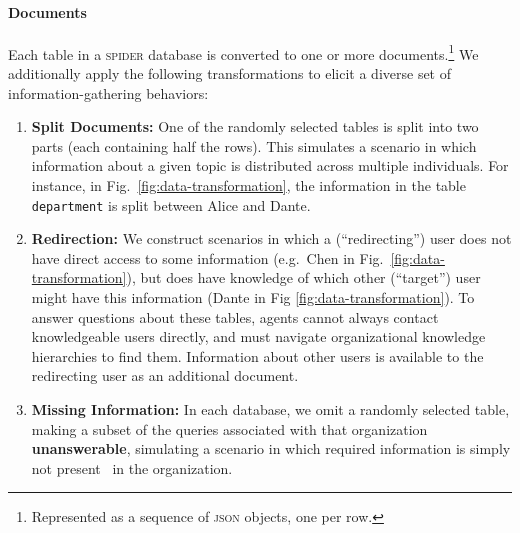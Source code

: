 \paragraph{Documents}
Each table in a \textsc{spider} database is converted to one or more documents.\footnote{Represented as a sequence of \textsc{json} objects, one per row.} We additionally apply the following transformations to elicit a diverse set of information-gathering behaviors:%

\begin{enumerate}
     \item \textbf{Split Documents:}  One of the randomly selected tables is split into two parts (each containing half the rows). This simulates a scenario in which information about a given topic is distributed across multiple individuals. 
     For instance, in Fig.~\ref{fig:data-transformation}, the information in the table \texttt{department} is split between Alice and Dante. 
    \item \textbf{Redirection:} We construct scenarios in which a (``redirecting'') user does not have direct access to some information (e.g.\ Chen in Fig.~\ref{fig:data-transformation}), but does have knowledge of which other (``target'') user might have this information (Dante in Fig \ref{fig:data-transformation}). To answer questions about these tables, agents cannot always contact knowledgeable users directly, and must navigate organizational knowledge hierarchies to find them.
    Information about other users is available to the redirecting user as an additional document.
    \item \textbf{Missing Information:} 
    In each database,
    we omit a randomly selected table, making a subset of the queries associated with that organization \textbf{unanswerable}, simulating a scenario in which required information is simply not present~\cite{levy-etal-2017-zero, rajpurkar2018know} in the organization. 
   
\end{enumerate}


